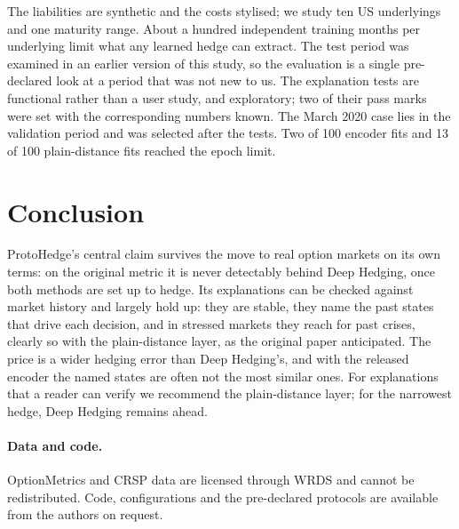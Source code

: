 \documentclass[runningheads]{llncs}
\begin{document}
The liabilities are synthetic and the costs stylised; we study ten US underlyings and one maturity range.
About a hundred independent training months per underlying limit what any learned hedge can extract. The
test period was examined in an earlier version of this study, so the evaluation is a single pre-declared
look at a period that was not new to us. The explanation tests are functional rather than a user study, and
exploratory; two of their pass marks were set with the corresponding numbers known. The March 2020 case lies
in the validation period and was selected after the tests. Two of 100 encoder fits and 13 of 100
plain-distance fits reached the epoch limit.

\section{Conclusion}

ProtoHedge's central claim survives the move to real option markets on its own terms: on the original
metric it is never detectably behind Deep Hedging, once both methods are set up to hedge. Its explanations
can be checked against market history and largely hold up: they are stable, they name the past states that
drive each decision, and in stressed markets they reach for past crises, clearly so with the plain-distance
layer, as the original paper anticipated. The price is a wider hedging error than Deep Hedging's, and with the released encoder the named
states are often not the most similar ones. For explanations that a reader can verify we recommend the
plain-distance layer; for the narrowest hedge, Deep Hedging remains ahead.

\paragraph{Data and code.} OptionMetrics and CRSP data are licensed through WRDS and cannot be
redistributed. Code, configurations and the pre-declared protocols are available from the authors on
request.



\end{document}

